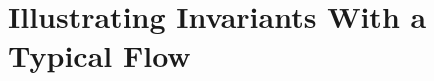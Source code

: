 \documentclass{llncs-new}
\def \twoSpaces {\ \ }
\def \twoSpaces {\ \ }
\begin{document}



\vspace{-10pt}
\section{Illustrating Invariants  With a Typical Flow \label{sec:relatingWithFlow}}
\end{document}
